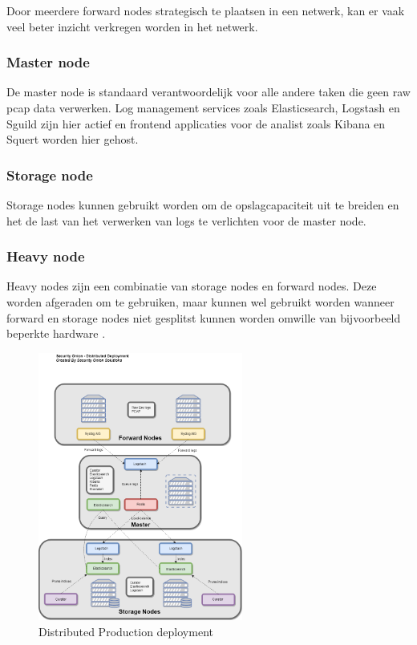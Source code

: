 \documentclass[a4paper, 12pt]{report}
\begin{document}
Door meerdere forward nodes strategisch te plaatsen in een netwerk, kan er vaak veel beter inzicht verkregen worden in het netwerk.

\subsubsection{Master node}
De master node is standaard verantwoordelijk voor alle andere taken die geen raw pcap data verwerken.
Log management services zoals Elasticsearch, Logstash en Sguild zijn hier actief en frontend applicaties voor de analist zoals Kibana en Squert worden hier gehost.

\subsubsection{Storage node}
Storage nodes kunnen gebruikt worden om de opslagcapaciteit uit te breiden en het de last van het verwerken van logs te verlichten voor de master node.

\subsubsection{Heavy node}
Heavy nodes zijn een combinatie van storage nodes en forward nodes.
Deze worden afgeraden om te gebruiken, maar kunnen wel gebruikt worden wanneer forward en storage nodes niet gesplitst kunnen worden omwille van bijvoorbeeld beperkte hardware \autocite{so:docs}.

\begin{figure}[H]
  \centering
  \includegraphics[width=0.6\textwidth]{so-architecture-production-distributed}
  \caption{Distributed Production deployment \autocite{so:docs}}
  \label{fig:so-architecture-distributed}
\end{figure}
\end{document}
